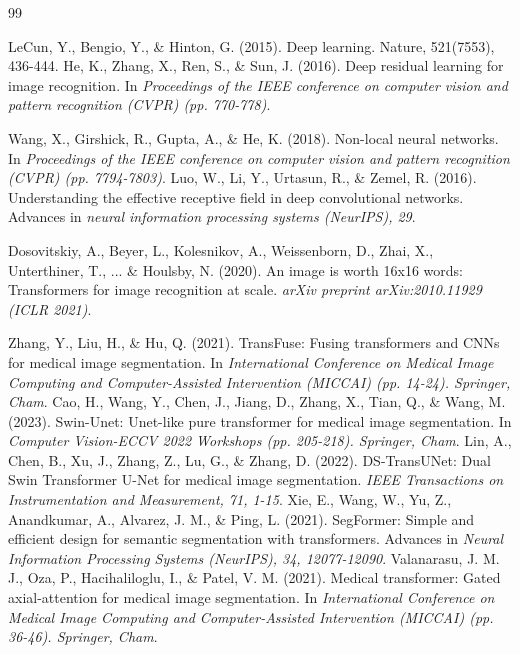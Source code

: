 \documentclass[10pt, a4paper, twocolumn]{article}
\begin{document}
\begin{thebibliography}{99}


LeCun, Y., Bengio, Y., \& Hinton, G. (2015). Deep learning. Nature, 521(7553), 436-444.
He, K., Zhang, X., Ren, S., \& Sun, J. (2016). Deep residual learning for image recognition. In \textit{Proceedings of the IEEE conference on computer vision and pattern recognition (CVPR) (pp. 770-778)}.

Wang, X., Girshick, R., Gupta, A., \& He, K. (2018). Non-local neural networks. In \textit{Proceedings of the IEEE conference on computer vision and pattern recognition (CVPR) (pp. 7794-7803)}. 
 Luo, W., Li, Y., Urtasun, R., \& Zemel, R. (2016). Understanding the effective receptive field in deep convolutional networks. Advances in \textit{neural information processing systems (NeurIPS), 29}. 

Dosovitskiy, A., Beyer, L., Kolesnikov, A., Weissenborn, D., Zhai, X., Unterthiner, T., ... \& Houlsby, N. (2020). An image is worth 16x16 words: Transformers for image recognition at scale. \textit{arXiv preprint arXiv:2010.11929 (ICLR 2021)}.  

Zhang, Y., Liu, H., \& Hu, Q. (2021). TransFuse: Fusing transformers and CNNs for medical image segmentation. In \textit{International Conference on Medical Image Computing and Computer-Assisted Intervention (MICCAI) (pp. 14-24). Springer, Cham}.
Cao, H., Wang, Y., Chen, J., Jiang, D., Zhang, X., Tian, Q., \& Wang, M. (2023). Swin-Unet: Unet-like pure transformer for medical image segmentation. In \textit{Computer Vision-ECCV 2022 Workshops (pp. 205-218). Springer, Cham}.
Lin, A., Chen, B., Xu, J., Zhang, Z., Lu, G., \& Zhang, D. (2022). DS-TransUNet: Dual Swin Transformer U-Net for medical image segmentation. \textit{IEEE Transactions on Instrumentation and Measurement, 71, 1-15}.
Xie, E., Wang, W., Yu, Z., Anandkumar, A., Alvarez, J. M., \& Ping, L. (2021). SegFormer: Simple and efficient design for semantic segmentation with transformers. Advances in \textit{Neural Information Processing Systems (NeurIPS), 34, 12077-12090}.
Valanarasu, J. M. J., Oza, P., Hacihaliloglu, I., \& Patel, V. M. (2021). Medical transformer: Gated axial-attention for medical image segmentation. In \textit{International Conference on Medical Image Computing and Computer-Assisted Intervention (MICCAI) (pp. 36-46). Springer, Cham}.



\end{thebibliography}
\end{document}
